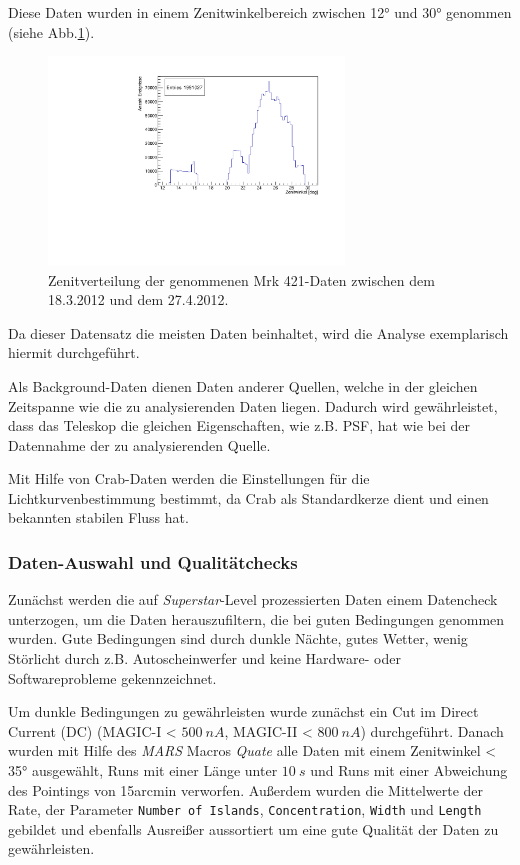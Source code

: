 Diese Daten wurden in einem Zenitwinkelbereich zwischen 12° und 30° genommen (siehe Abb.\ref{Datenset2_fZD}).

\begin{figure}
    \centering
    \includegraphics[width=0.7\textwidth]{./Plots/04_MrkAnalyse/Datenset2/Datenset2_Mrk421_MPointingPos_fZd.pdf}
    \caption{Zenitverteilung der genommenen Mrk 421-Daten zwischen dem 18.3.2012 und dem 27.4.2012.}
    \label{Datenset2_fZD}
\end{figure}


Da dieser Datensatz die meisten Daten beinhaltet, wird die Analyse exemplarisch hiermit durchgeführt.

Als Background-Daten dienen Daten anderer Quellen, welche in der gleichen Zeitspanne wie die zu analysierenden Daten liegen.
Dadurch wird gewährleistet, dass das Teleskop die gleichen Eigenschaften, wie z.B. PSF, hat wie bei der Datennahme der zu analysierenden Quelle. 

Mit Hilfe von Crab-Daten werden die Einstellungen für die Lichtkurvenbestimmung bestimmt, da Crab als Standardkerze dient und einen bekannten stabilen Fluss hat. 


\subsubsection{Daten-Auswahl und Qualitätchecks}
Zunächst werden die auf \textit{Superstar}-Level prozessierten Daten einem Datencheck unterzogen, um die Daten herauszufiltern, die bei guten Bedingungen genommen wurden.
Gute Bedingungen sind durch dunkle Nächte, gutes Wetter, wenig Störlicht durch z.B. Autoscheinwerfer und keine Hardware- oder Softwareprobleme gekennzeichnet.

Um dunkle Bedingungen zu gewährleisten wurde zunächst ein Cut im Direct Current (DC) (MAGIC-I < $\SI{500}{nA}$, MAGIC-II < $\SI{800}{nA}$) durchgeführt.
Danach wurden mit Hilfe des \textit{MARS} Macros \textit{Quate} alle Daten mit einem Zenitwinkel < 35° ausgewählt, Runs mit einer Länge unter $\SI{10}{s}$ und Runs mit einer Abweichung des Pointings von 15arcmin verworfen.
Außerdem wurden die Mittelwerte der Rate, der Parameter \texttt{Number of Islands}, \texttt{Concentration}, \texttt{Width} und \texttt{Length} gebildet und ebenfalls Ausreißer aussortiert um eine gute Qualität der Daten zu gewährleisten.

